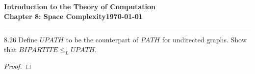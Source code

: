 \documentclass[11pt]{article}
\newcommand{\dated}{\today}
\begin{document}
\textbf{Introduction to the Theory of
Computation}\hfill\textbf{\myname}\\[0.01in]
\textbf{Chapter 8: Space Complexity}\hfill\textbf{\dated}\\
\smallskip\hrule\bigskip

\begin{problem}{8.26}
Define $UPATH$ to be the counterpart of $PATH$ for undirected graphs. Show that $\overline{BIPARTITE} \leq_L UPATH$.
\end{problem}

\begin{proof}


\end{proof}
\end{document}
